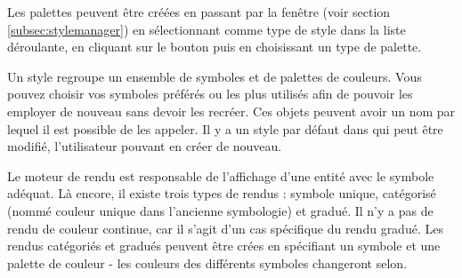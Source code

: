 Les palettes peuvent être créées en passant par la fenêtre  (voir section \ref{subsec:stylemanager}) en sélectionnant  comme type de style dans la liste déroulante, en cliquant sur le bouton  puis en choisissant un type de palette.


Un style regroupe un ensemble de symboles et de palettes de couleurs. Vous pouvez choisir vos symboles préférés ou les plus utilisés afin de pouvoir les employer de nouveau sans devoir les recréer. Ces objets peuvent avoir un nom par lequel il est possible de les appeler. Il y a un style par défaut dans \qg qui peut être modifié, l'utilisateur pouvant en créer de nouveau.


Le moteur de rendu est responsable de l'affichage d'une entité avec le symbole adéquat. Là encore, il existe trois types de rendus : symbole unique, catégorisé (nommé couleur unique dans l'ancienne symbologie) et gradué. Il n'y a pas de rendu de couleur continue, car il s'agit d'un cas spécifique du rendu gradué. Les rendus catégoriés et gradués peuvent être crées en spécifiant un symbole et une palette de couleur - les couleurs des différents symboles changeront selon.

